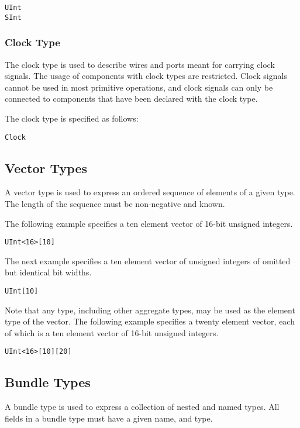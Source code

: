\documentclass[12pt]{article}
\begin{document}
\begin{verbatim}
UInt
SInt
\end{verbatim}  

\subsubsection{Clock Type}

The clock type is used to describe wires and ports meant for carrying clock signals. The usage of components with clock types are restricted. Clock signals cannot be used in most primitive operations, and clock signals can only be connected to components that have been declared with the clock type. 

The clock type is specified as follows:
\begin{verbatim}
Clock
\end{verbatim}  

\subsection{Vector Types}

A vector type is used to express an ordered sequence of elements of a given type. The length of the sequence must be non-negative and known. 

The following example specifies a ten element vector of 16-bit unsigned integers.
\begin{verbatim}
UInt<16>[10]
\end{verbatim}  

The next example specifies a ten element vector of unsigned integers of omitted but identical bit widths.
\begin{verbatim}
UInt[10]
\end{verbatim}

Note that any type, including other aggregate types, may be used as the element type of the vector. The following example specifies a twenty element vector, each of which is a ten element vector of 16-bit unsigned integers.
\begin{verbatim}
UInt<16>[10][20]
\end{verbatim} 

\subsection{Bundle Types}

A bundle type is used to express a collection of nested and named types. All fields in a bundle type must have a given name, and type. 
\end{document}
